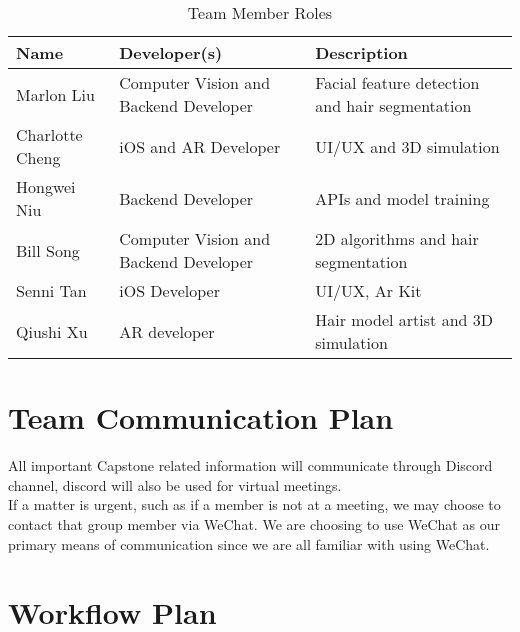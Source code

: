 \documentclass{article}
\begin{document}
\begin{table}[h]
\caption{Team Member Roles} \label{TblMembers}
\begin{tabularx}{\textwidth}{lXX}
\toprule
\textbf{Name} & \textbf{Developer(s)} & \textbf{Description}\\
\midrule
Marlon Liu & Computer Vision and Backend Developer & Facial feature detection and hair segmentation \\
\midrule
Charlotte Cheng & iOS and AR Developer & UI/UX and 3D simulation\\
\midrule
Hongwei Niu & Backend Developer & APIs and model training\\
\midrule
Bill Song & Computer Vision and Backend Developer & 2D algorithms and hair segmentation\\
\midrule
Senni Tan & iOS Developer & UI/UX, Ar Kit\\
\midrule
Qiushi Xu & AR developer & Hair model artist and 3D simulation\\ 
\bottomrule
\end{tabularx}
\end{table}

\section{Team Communication Plan}
All important Capstone related information will communicate through Discord channel, discord will also be used for virtual meetings. 
\\ If a matter is urgent, such as if a member is not at a meeting, we may choose to contact that group member via WeChat. We are choosing to use WeChat as our primary means of communication since we are all familiar with using WeChat.

\section{Workflow Plan}
\end{document}

